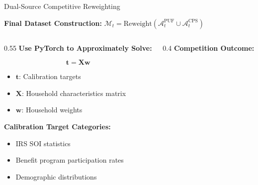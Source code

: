 \documentclass[11pt,aspectratio=169]{beamer}
\begin{document}
\begin{frame}{Dual-Source Competitive Reweighting}

\begin{center}
\textbf{Final Dataset Construction:} $\mathcal{M}_t = \text{Reweight}(\mathcal{A}_t^{\text{PUF}} \cup \mathcal{A}_t^{\text{CPS}})$
\end{center}

\vspace{0.3cm}

\begin{columns}
\begin{column}{0.55\textwidth}
  \textbf{Use PyTorch to Approximately Solve:}

\vspace{0.2cm}
$$\mathbf{t} = \mathbf{X}\mathbf{w}$$

\vspace{0.2cm}
\begin{itemize}
    \item $\mathbf{t}$: Calibration targets
    \item $\mathbf{X}$: Household characteristics matrix
    \item $\mathbf{w}$: Household weights
\end{itemize}

\vspace{0.3cm}
\textbf{Calibration Target Categories:}
\begin{itemize}
    \item IRS SOI statistics
    \item Benefit program participation rates
    \item Demographic distributions
\end{itemize}

\end{column}

\begin{column}{0.4\textwidth}
\textbf{Competition Outcome:}

\vspace{0.3cm}

\end{column}
\end{columns}
\end{frame}
\end{document}
